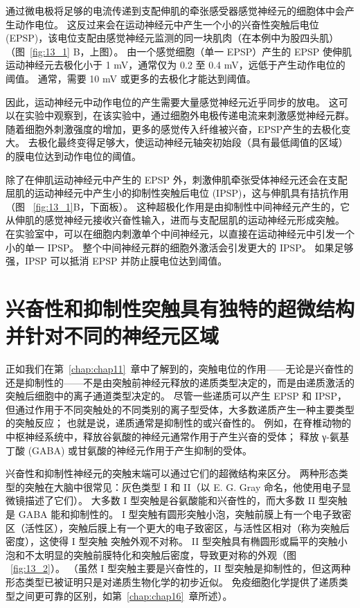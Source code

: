 通过微电极将足够的电流传递到支配伸肌的牵张感受器感觉神经元的细胞体中会产生动作电位。
这反过来会在运动神经元中产生一个小的兴奋性突触后电位 (EPSP)，该电位支配由感觉神经元监测的同一块肌肉（在本例中为股四头肌）（图~\ref{fig:13_1} B，上图）。
由一个感觉细胞（单一 EPSP）产生的 EPSP 使伸肌运动神经元去极化小于 1 mV，通常仅为 0.2 至 0.4 mV，远低于产生动作电位的阈值。
通常，需要 10 mV 或更多的去极化才能达到阈值。


因此，运动神经元中动作电位的产生需要大量感觉神经元近乎同步的放电。
这可以在实验中观察到，在该实验中，通过细胞外电极传递电流来刺激感觉神经元群。
随着细胞外刺激强度的增加，更多的感觉传入纤维被兴奋，EPSP产生的去极化变大。
去极化最终变得足够大，使运动神经元轴突初始段（具有最低阈值的区域）的膜电位达到动作电位的阈值。


除了在伸肌运动神经元中产生的 EPSP 外，刺激伸肌牵张受体神经元还会在支配屈肌的运动神经元中产生小的抑制性突触后电位 (IPSP)，这与伸肌具有拮抗作用（图 ~\ref{fig:13_1}B，下面板）。
这种超极化作用是由抑制性中间神经元产生的，它从伸肌的感觉神经元接收兴奋性输入，进而与支配屈肌的运动神经元形成突触。
在实验室中，可以在细胞内刺激单个中间神经元，以直接在运动神经元中引发一个小的单一 IPSP。
整个中间神经元群的细胞外激活会引发更大的 IPSP。
如果足够强，IPSP 可以抵消 EPSP 并防止膜电位达到阈值。



\section{兴奋性和抑制性突触具有独特的超微结构并针对不同的神经元区域}

正如我们在第~\ref{chap:chap11}~章中了解到的，突触电位的作用——无论是兴奋性的还是抑制性的——不是由突触前神经元释放的递质类型决定的，而是由递质激活的突触后细胞中的离子通道类型决定的。
尽管一些递质可以产生 EPSP 和 IPSP，但通过作用于不同突触处的不同类别的离子型受体，大多数递质产生一种主要类型的突触反应；
也就是说，递质通常是抑制性的或兴奋性的。
例如，在脊椎动物的中枢神经系统中，释放谷氨酸的神经元通常作用于产生兴奋的受体；
释放 γ-氨基丁酸 (GABA) 或甘氨酸的神经元作用于产生抑制的受体。


兴奋性和抑制性神经元的突触末端可以通过它们的超微结构来区分。
两种形态类型的突触在大脑中很常见：灰色类型 I 和 II（以 E. G. Gray 命名，他使用电子显微镜描述了它们）。
大多数 I 型突触是谷氨酸能和兴奋性的，而大多数 II 型突触是 GABA 能和抑制性的。
I 型突触有圆形突触小泡，突触前膜上有一个电子致密区（活性区），突触后膜上有一个更大的电子致密区，与活性区相对（称为突触后密度），这使得 I 型突触 突触外观不对称。 
II 型突触具有椭圆形或扁平的突触小泡和不太明显的突触前膜特化和突触后密度，导致更对称的外观（图 ~\ref{fig:13_2}）。 
（虽然 I 型突触主要是兴奋性的，II 型突触是抑制性的，但这两种形态类型已被证明只是对递质生物化学的初步近似。
免疫细胞化学提供了递质类型之间更可靠的区别，如第~\ref{chap:chap16}~章所述）。


